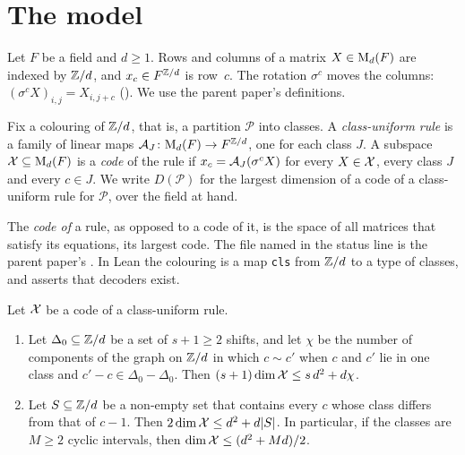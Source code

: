 \section{The model}\label{sec:prelim}

Let $F$ be a field and $d\ge1$. Rows and columns of a matrix $X\in\mathrm{M}_d(F)$ are indexed by $\mathbb{Z}/d$, and $x_c\in F^{\mathbb{Z}/d}$
is row~$c$. The rotation $\sigma^c$ moves the columns: $(\sigma^cX)_{i,j}=X_{i,j+c}$ (). We use
the parent paper's definitions.

\begin{definition}\label{def:class-uniform}
Fix a colouring of $\mathbb{Z}/d$, that is, a partition $\mathcal P$ into classes. A \emph{class-uniform rule} is a family of
linear maps $\mathcal{A}_J\colon\mathrm{M}_d(F)\to F^{\mathbb{Z}/d}$, one for each class $J$. A subspace $\mathcal{X}\subseteq\mathrm{M}_d(F)$ is a
\emph{code} of the rule if $x_c=\mathcal{A}_J(\sigma^cX)$ for every $X\in\mathcal{X}$, every class $J$ and every $c\in J$. We write
$D(\mathcal P)$ for the largest dimension of a code of a class-uniform rule for $\mathcal P$, over the field at hand.
\end{definition}

The \emph{code of} a rule, as opposed to a code of it, is the space of all matrices that satisfy its equations, its
largest code. The file named in the status line is the parent paper's . In Lean the colouring is a map
\texttt{cls} from $\mathbb{Z}/d$ to a type of classes, and  asserts that decoders exist.

\begin{theorem}\label{thm:TP}
Let $\mathcal{X}$ be a code of a class-uniform rule.
\begin{enumerate}[label=(\alph*),leftmargin=2em]
\item Let $\Delta_0\subseteq\mathbb{Z}/d$ be a set of $s+1\ge2$ shifts, and let $\chi$ be the number of components of the graph
on $\mathbb{Z}/d$ in which $c\sim c'$ when $c$ and $c'$ lie in one class and $c'-c\in\Delta_0-\Delta_0$. Then
$(s+1)\dim\mathcal{X}\le s\,d^2+d\chi$.
\item Let $S\subseteq\mathbb{Z}/d$ be a non-empty set that contains every $c$ whose class differs from that of $c-1$. Then
$2\dim\mathcal{X}\le d^2+d\lvert S \rvert$. In particular, if the classes are $M\ge2$ cyclic intervals, then $\dim\mathcal{X}\le(d^2+Md)/2$.
\end{enumerate}
\end{theorem}

